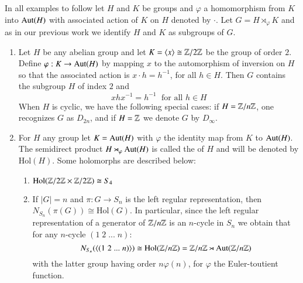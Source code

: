\documentclass[12pt, a4paper, twoside, openright, titlepage]{book}
\begin{document}
\begin{eg}{}{}
    In all examples to follow let $H$ and $K$ be groups and $\varphi$ a homomorphism from $K$ into $\operatorname{Aut}(H)$ with associated action of $K$ on $H$ denoted by $\cdot$. Let $G = H\rtimes_{\varphi}K$ and as in our previous work we identify $H$ and $K$ as subgroups of $G$. 
    \begin{enumerate}
        \item Let $H$ be any abelian group and let $K = \langle x \rangle \cong \mathbb Z/2\mathbb Z$ be the group of order $2$. Define $\varphi:K\rightarrow \operatorname{Aut}(H)$ by mapping $x$ to the automorphism of inversion on $H$ so that the associated action is $x\cdot h = h^{-1}$, for all $h \in H$. Then $G$ contains the subgroup $H$ of index $2$ and \begin{equation*}
                xhx^{-1} = h^{-1}\;\text{ for all } h \in H
        \end{equation*}
            When $H$ is cyclic, we have the following special cases: if $H = \mathbb Z/n\mathbb Z$, one recognizes $G$ as $D_{2n}$, and if $H = \mathbb Z$ we denote $G$ by $D_{\infty}$.
        \item For $H$ any group let $K = \operatorname{Aut}(H)$ with $\varphi$ the identity map from $K$ to $\operatorname{Aut}(H)$. The semidirect product $H\rtimes_{\varphi}\operatorname{Aut}(H)$ is called the  of $H$ and will be denoted by $\text{Hol}(H)$. Some holomorphs are described below: \begin{enumerate}
                \item $\text{Hol}(\mathbb Z/2\mathbb Z\times\mathbb Z/2\mathbb Z)\cong S_4$
                \item If $|G| = n$ and $\pi:G\rightarrow S_n$ is the left regular representation, then $N_{S_n}(\pi(G)) \cong \text{Hol}(G)$. In particular, since the left regular representation of a generator of $\mathbb Z/n\mathbb Z$ is an $n$-cycle in $S_n$ we obtain that for any $n$-cycle $(1\;2\;...\;n)$: \begin{equation*}
                        N_{S_n}(\langle(1\;2\;...\;n)\rangle) \cong \text{Hol}(\mathbb Z/n\mathbb Z)=\mathbb Z/n\mathbb Z\rtimes \operatorname{Aut}(\mathbb Z/n\mathbb Z)
                \end{equation*}
                with the latter group having order $n\varphi(n)$, for $\varphi$ the Euler-toutient function.
        \end{enumerate}
    \end{enumerate}
\end{eg}
\end{document}
